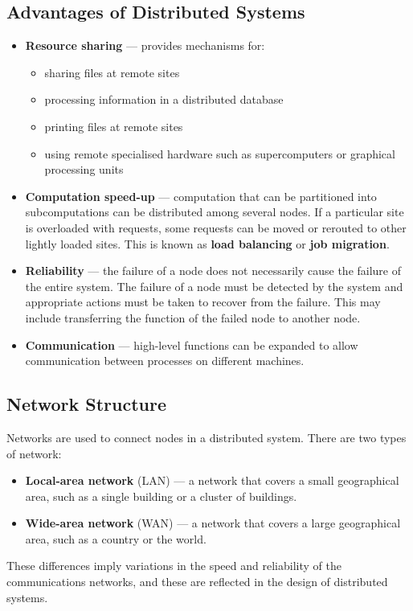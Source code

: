 \documentclass{article}
\begin{document}
\subsection{Advantages of Distributed Systems}
\begin{itemize}
    \item \textbf{Resource sharing} --- provides mechanisms for:
          \begin{itemize}
              \item sharing files at remote sites
              \item processing information in a distributed database
              \item printing files at remote sites
              \item using remote specialised hardware such as
                    supercomputers or graphical processing units
          \end{itemize}
    \item \textbf{Computation speed-up} --- computation that can be
          partitioned into subcomputations can be distributed among several
          nodes. If a particular site is overloaded with requests, some
          requests can be moved or rerouted to other lightly loaded sites.
          This is known as \textbf{load balancing} or \textbf{job migration}.
    \item \textbf{Reliability} --- the failure of a node does not
          necessarily cause the failure of the entire system. The
          failure of a node must be detected by the system and
          appropriate actions must be taken to recover from the failure.
          This may include transferring the function of the failed node
          to another node.
    \item \textbf{Communication} --- high-level functions can be
          expanded to allow communication between processes on different
          machines.
\end{itemize}
\subsection{Network Structure}
Networks are used to connect nodes in a distributed system. There are
two types of network:
\begin{itemize}
    \item \textbf{Local-area network} (LAN) --- a network that covers
          a small geographical area, such as a single building or a
          cluster of buildings.
    \item \textbf{Wide-area network} (WAN) --- a network that covers
          a large geographical area, such as a country or the world.
\end{itemize}
These differences imply variations in the speed and reliability of the
communications networks, and these are reflected in the design of
distributed systems.
\end{document}
